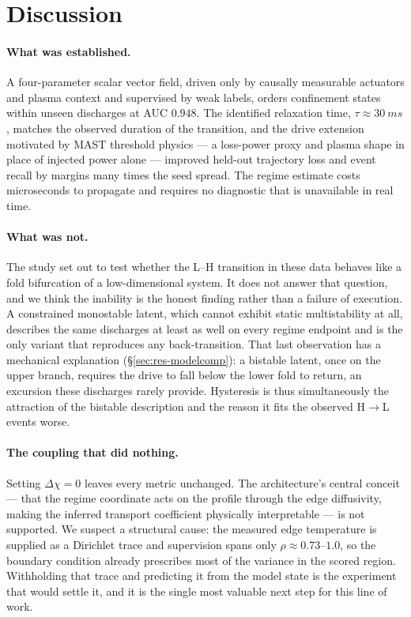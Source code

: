 \documentclass[11pt]{article}
\begin{document}


\FloatBarrier

\section{Discussion}
\label{sec:discussion}

\paragraph{What was established.} A four-parameter scalar vector field,
driven only by causally measurable actuators and plasma context and
supervised by weak labels, orders confinement states within unseen
discharges at AUC $0.948$. The identified relaxation time,
$\tau \approx \SI{30}{ms}$, matches the observed duration of the
transition, and the drive extension motivated by MAST threshold physics ---
a loss-power proxy and plasma shape in place of injected power alone ---
improved held-out trajectory loss and event recall by margins many times
the seed spread. The regime estimate costs microseconds to propagate and
requires no diagnostic that is unavailable in real time.

\paragraph{What was not.} The study set out to test whether the L--H
transition in these data behaves like a fold bifurcation of a
low-dimensional system. It does not answer that question, and we think the
inability is the honest finding rather than a failure of execution. A
constrained monostable latent, which cannot exhibit static multistability at
all, describes the same discharges at least as well on every regime
endpoint and is the only variant that reproduces any back-transition.
That last observation has a mechanical explanation
(\S\ref{sec:res-modelcomp}): a bistable latent, once on the upper branch,
requires the drive to fall below the lower fold to return, an excursion
these discharges rarely provide. Hysteresis is thus simultaneously the
attraction of the bistable description and the reason it fits the observed
H$\to$L events worse.

\paragraph{The coupling that did nothing.} Setting $\Delta\chi = 0$ leaves
every metric unchanged. The architecture's central conceit --- that the
regime coordinate acts on the profile through the edge diffusivity, making
the inferred transport coefficient physically interpretable --- is not
supported. We suspect a structural cause: the measured edge temperature is
supplied as a Dirichlet trace and supervision spans only
$\rho \approx 0.73$--$1.0$, so the boundary condition already prescribes
most of the variance in the scored region. Withholding that trace and
predicting it from the model state is the experiment that would settle it,
and it is the single most valuable next step for this line of work.
\end{document}
